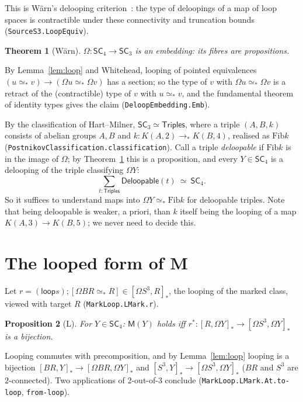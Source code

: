 \documentclass[11pt]{amsart}
\newtheorem{theorem}{Theorem}
\newtheorem{proposition}[theorem]{Proposition}
\theoremstyle{definition}
\theoremstyle{remark}
\newcommand{\Om}{\Omega}
\newcommand{\code}[1]{\texttt{#1}}
\newcommand{\hc}[2]{[#1,#2]_*}
\newcommand{\Fib}{\mathrm{Fib}}
\newcommand{\cls}[1]{[#1]}
\newcommand{\lp}{\mathsf{loop}}
\newcommand{\SCt}{\mathsf{SC}_3}
\newcommand{\SCf}{\mathsf{SC}_4}
\newcommand{\Tri}{\mathsf{Triples}}
\newcommand{\pteq}{\simeq_*}
\begin{document}
This is W\"arn's delooping criterion~\cite{DW1}: the type of deloopings of a
map of loop spaces is contractible under these connectivity and truncation
bounds (\code{SourceS3.LoopEquiv}).

\begin{theorem}[W\"arn]\label{thm:emb}
$\Om:\SCf\to\SCt$ is an embedding: its fibres are propositions.
\end{theorem}

\noindent By Lemma~\ref{lem:loop} and Whitehead, looping of pointed
equivalences $(u\pteq v)\to(\Om u\pteq\Om v)$ has a section; so the type of
$v$ with $\Om u\pteq\Om v$ is a retract of the (contractible) type of $v$ with
$u\pteq v$, and the fundamental theorem of identity types gives the claim
(\code{DeloopEmbedding.Emb}).

By the classification of Hart--Milner, $\SCt\simeq\Tri$, where a triple
$(A,B,k)$ consists of abelian groups $A,B$ and $k:K(A,2)\to_*K(B,4)$, realised
as $\Fib k$ (\code{PostnikovClassification.classification}). Call a triple
\emph{deloopable} if $\Fib k$ is in the image of $\Om$; by
Theorem~\ref{thm:emb} this is a proposition, and every $Y\in\SCf$ is a delooping
of the triple classifying $\Om Y$:
\[
  \textstyle\sum_{t:\Tri}\mathsf{Deloopable}(t)\ \simeq\ \SCf .
\]
So it suffices to understand maps into $\Om Y\pteq\Fib k$ for deloopable
triples. Note that being deloopable is weaker, a priori, than $k$ itself being
the looping of a map $K(A,3)\to K(B,5)$; we never need to decide this.

\section{The looped form of M}\label{s:loop}

Let $r=(\lp s);\cls{\Om BR\pteq R}\in\hc{\Om S^3}{R}$, the looping of the marked
class, viewed with target $R$ (\code{MarkLoop.LMark.r}).

\begin{proposition}[L]\label{prop:L}
For $Y\in\SCf$: $\mathsf M(Y)$ holds iff
$r^*:\hc{R}{\Om Y}\to\hc{\Om S^3}{\Om Y}$ is a bijection.
\end{proposition}

\noindent Looping commutes with precomposition, and by
Lemma~\ref{lem:loop} looping is a bijection
$\hc{BR}{Y}\to\hc{\Om BR}{\Om Y}$ and $\hc{S^3}{Y}\to\hc{\Om S^3}{\Om Y}$
($BR$ and $S^3$ are $2$-connected). Two applications of 2-out-of-3 conclude
(\code{MarkLoop.LMark.At.to-loop}, \code{from-loop}).
\end{document}
